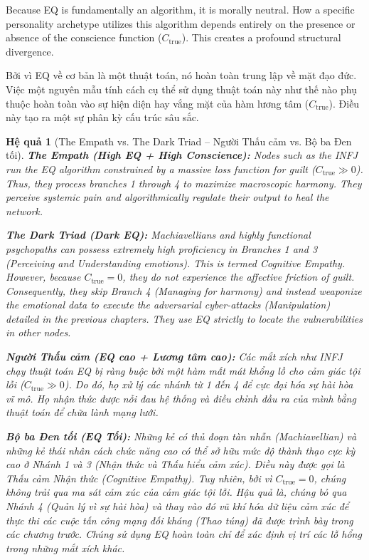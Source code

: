\documentclass{report}
\newtheorem{hequa}{Hệ quả}
\begin{document}
Because EQ is fundamentally an algorithm, it is morally neutral. How a specific personality archetype utilizes this algorithm depends entirely on the presence or absence of the conscience function ($C_{\text{true}}$). This creates a profound structural divergence.

Bởi vì EQ về cơ bản là một thuật toán, nó hoàn toàn trung lập về mặt đạo đức. Việc một nguyên mẫu tính cách cụ thể sử dụng thuật toán này như thế nào phụ thuộc hoàn toàn vào sự hiện diện hay vắng mặt của hàm lương tâm ($C_{\text{true}}$). Điều này tạo ra một sự phân kỳ cấu trúc sâu sắc.

\begin{hequa}[The Empath vs. The Dark Triad -- Người Thấu cảm vs. Bộ ba Đen tối]
	\textbf{The Empath (High EQ + High Conscience):} Nodes such as the INFJ run the EQ algorithm constrained by a massive loss function for guilt ($C_{\text{true}} \gg 0$). Thus, they process branches 1 through 4 to maximize macroscopic harmony. They perceive systemic pain and algorithmically regulate their output to heal the network.
	
	\textbf{The Dark Triad (Dark EQ):} Machiavellians and highly functional psychopaths can possess extremely high proficiency in Branches 1 and 3 (Perceiving and Understanding emotions). This is termed \textit{Cognitive Empathy}. However, because $C_{\text{true}} = 0$, they do not experience the affective friction of guilt. Consequently, they skip Branch 4 (Managing for harmony) and instead weaponize the emotional data to execute the adversarial cyber-attacks (Manipulation) detailed in the previous chapters. They use EQ strictly to locate the vulnerabilities in other nodes.
	
	\textbf{Người Thấu cảm (EQ cao + Lương tâm cao):} Các mắt xích như INFJ chạy thuật toán EQ bị ràng buộc bởi một hàm mất mát khổng lồ cho cảm giác tội lỗi ($C_{\text{true}} \gg 0$). Do đó, họ xử lý các nhánh từ 1 đến 4 để cực đại hóa sự hài hòa vĩ mô. Họ nhận thức được nỗi đau hệ thống và điều chỉnh đầu ra của mình bằng thuật toán để chữa lành mạng lưới.
	
	\textbf{Bộ ba Đen tối (EQ Tối):} Những kẻ có thủ đoạn tàn nhẫn (Machiavellian) và những kẻ thái nhân cách chức năng cao có thể sở hữu mức độ thành thạo cực kỳ cao ở Nhánh 1 và 3 (Nhận thức và Thấu hiểu cảm xúc). Điều này được gọi là \textit{Thấu cảm Nhận thức} (Cognitive Empathy). Tuy nhiên, bởi vì $C_{\text{true}} = 0$, chúng không trải qua ma sát cảm xúc của cảm giác tội lỗi. Hậu quả là, chúng bỏ qua Nhánh 4 (Quản lý vì sự hài hòa) và thay vào đó vũ khí hóa dữ liệu cảm xúc để thực thi các cuộc tấn công mạng đối kháng (Thao túng) đã được trình bày trong các chương trước. Chúng sử dụng EQ hoàn toàn chỉ để xác định vị trí các lỗ hổng trong những mắt xích khác.
\end{hequa}
\end{document}
